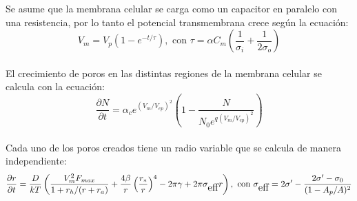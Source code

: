 \documentclass[a0,portrait]{a0poster}
\begin{document}
\begin{multicols}{2}
			

			Se asume que la membrana celular se carga como un capacitor en paralelo con una resistencia, por lo tanto el potencial transmembrana crece según la ecuación:
			\begin{equation}
				V_m = V_p (1 - e^{-t/\tau}),
				\textrm{ con } \tau = \alpha C_m \left( \frac{1}{\sigma_i} + \frac{1}{2 \sigma_o} \right)
			\end{equation}\\
			

	El crecimiento de poros en las distintas regiones de la membrana celular se calcula con la ecuación:
	\begin{equation}
		\frac{\partial N}{\partial t} = \alpha_c e^{(V_m/V_{ep})^2} 
			\left( 1 - \frac{N}{N_0 e^{q \left(V_m/V_{ep} \right) ^2}} \right)
	\end{equation}\\


	Cada uno de los poros creados tiene un radio variable que se calcula de manera independiente:
	\begin{equation}
		\frac{\partial r}{\partial t} = \frac{D}{kT} \left( \frac{V_m^2 F_{max}}
			{1+r_h / (r+r_a)} + \frac{4 \beta}{r} \left(\frac{r_*}{r}\right)^4 
			- 2 \pi \gamma + 2 \pi \sigma_{\textrm{\tiny eff}} r\right),			
		\textrm{ con }\sigma_{\textrm{\tiny eff}} = 2 \sigma^\prime - 
			\frac{2 \sigma^\prime - \sigma_0}{(1 - A_p / A)^2}
	\end{equation}\\
	

\end{multicols}
\end{document}
